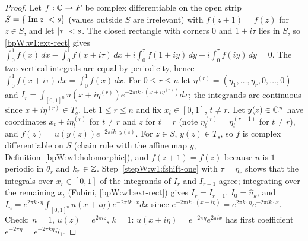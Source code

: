 \begin{proof}
\label{stepW:w1:fshift-one}
Let $f:\mathbb{C}\to F$ be complex differentiable on the open strip $S=\{\lvert \operatorname{Im}z\rvert<s\}$ (values outside $S$
are irrelevant) with $f(z+1)=f(z)$ for $z\in S$, and let $\lvert \tau\rvert<s$. The closed rectangle with corners $0$ and
$1+i\tau$ lies in $S$, so \ref{bpW:w1:ext-rect} gives
$\int_0^1f(x)\,dx-\int_0^1f(x+i\tau)\,dx+i\int_0^\tau f(1+iy)\,dy-i\int_0^\tau f(iy)\,dy=0$. The two vertical integrals
are equal by periodicity, hence $\int_0^1f(x+i\tau)\,dx=\int_0^1f(x)\,dx$.
\label{stepW:w1:fshift-iter}
For $0\le r\le n$ let $\eta^{(r)}=(\eta_1,\dots,\eta_r,0,\dots,0)$ and
$I_r=\int_{[0,1]^n}u(x+i\eta^{(r)})e^{-2\pi ik\cdot(x+i\eta^{(r)})}dx$; the integrands are continuous since
$x+i\eta^{(r)}\in T_s$. Let $1\le r\le n$ and fix $x_t\in[0,1]$, $t\ne r$. Let $y(z)\in\mathbb{C}^n$ have coordinates
$x_t+i\eta_t^{(r)}$ for $t\ne r$ and $z$ for $t=r$ (note $\eta^{(r)}_t=\eta^{(r-1)}_t$ for $t\ne r$), and
$f(z)=u(y(z))e^{-2\pi ik\cdot y(z)}$. For $z\in S$, $y(z)\in T_s$, so $f$ is complex differentiable on $S$ (chain rule
with the affine map $y$, Definition~\ref{bpW:w1:holomorphic}), and $f(z+1)=f(z)$ because $u$ is $1$-periodic in
$\theta_r$ and $k_r\in\mathbb{Z}$. Step~\ref{stepW:w1:fshift-one} with $\tau=\eta_r$ shows that the integrals over $x_r\in[0,1]$
of the integrands of $I_r$ and $I_{r-1}$ agree; integrating over the remaining $x_t$ (Fubini, \ref{bpW:w1:ext-rect})
gives $I_r=I_{r-1}$.
\label{stepW:w1:fshift-end}
$I_0=\hat u_k$, and $I_n=e^{2\pi k\cdot\eta}\int_{[0,1]^n}u(x+i\eta)e^{-2\pi ik\cdot x}dx$ since
$e^{-2\pi ik\cdot(x+i\eta)}=e^{2\pi k\cdot\eta}e^{-2\pi ik\cdot x}$. Check: $n=1$, $u(z)=e^{2\pi iz}$, $k=1$:
$u(x+i\eta)=e^{-2\pi\eta}e^{2\pi ix}$ has first coefficient $e^{-2\pi\eta}=e^{-2\pi k\eta}\hat u_1$.
\end{proof}

